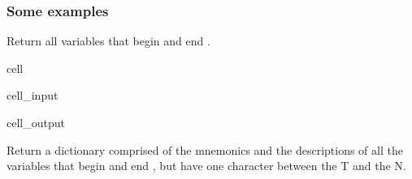 \documentclass[letterpaper,10pt,english]{jupyterBook}
\begin{document}
\subsubsection{Some examples}
\label{\detokenize{content/05_WBModels/LoadingWBModel:some-examples}}
\sphinxAtStartPar
Return all variables that begin  and end .

\begin{sphinxuseclass}{cell}\begin{sphinxVerbatimInput}

\begin{sphinxuseclass}{cell_input}
\begin{sphinxVerbatim}[commandchars=\\\{\}]
\PYG{p}{[}\PYG{p}{]}
\end{sphinxVerbatim}

\end{sphinxuseclass}\end{sphinxVerbatimInput}
\begin{sphinxVerbatimOutput}

\begin{sphinxuseclass}{cell_output}
\begin{sphinxVerbatim}
\end{sphinxVerbatim}

\end{sphinxuseclass}\end{sphinxVerbatimOutput}

\end{sphinxuseclass}
\sphinxAtStartPar
Return a dictionary comprised of the mnemonics and the descriptions of all the variables that begin  and end , but have one character between the T and the N.
\end{document}
